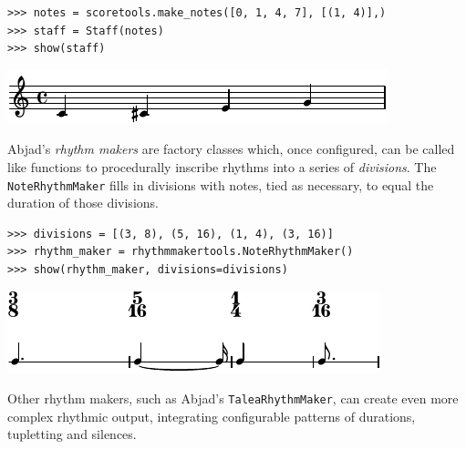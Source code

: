 \documentclass{article}
\begin{document}

\begin{lstlisting}
>>> notes = scoretools.make_notes([0, 1, 4, 7], [(1, 4)],)
>>> staff = Staff(notes)
>>> show(staff)
\end{lstlisting}
\includegraphics{assets/lilypond-64155bcaa384109d40ae2616a2224dd1.pdf}

Abjad's \emph{rhythm makers} are factory classes which, once configured, can be
called like functions to procedurally inscribe rhythms into a series of
\emph{divisions}. The \texttt{NoteRhythmMaker} fills in divisions with notes,
tied as necessary, to equal the duration of those divisions.

\begin{lstlisting}
>>> divisions = [(3, 8), (5, 16), (1, 4), (3, 16)]
>>> rhythm_maker = rhythmmakertools.NoteRhythmMaker()
>>> show(rhythm_maker, divisions=divisions)
\end{lstlisting}
\includegraphics{assets/lilypond-af2aa88dc88360a6a0cf5c3f8da17b85.pdf}

Other rhythm makers, such as Abjad's \texttt{TaleaRhythmMaker}, can create even
more complex rhythmic output, integrating configurable patterns of durations,
tupletting and silences.

\end{document}

